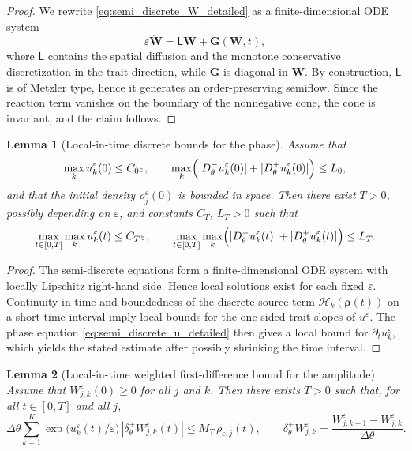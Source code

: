 \documentclass[11pt, dina4, amsfont12]{article}
\newtheorem{lemma}{Lemma}[section]
\begin{document}
\begin{proof}
We rewrite \eqref{eq:semi_discrete_W_detailed} as a finite-dimensional ODE system
\[
\varepsilon \dot{\mathbf W}=\mathsf L\mathbf W+\mathbf G(\mathbf W,t),
\]
where \(\mathsf L\) contains the spatial diffusion and the monotone conservative discretization in the trait direction, while \(\mathbf G\) is diagonal in \(\mathbf W\). By construction, \(\mathsf L\) is of Metzler type, hence it generates an order-preserving semiflow. Since the reaction term vanishes on the boundary of the nonnegative cone, the cone is invariant, and the claim follows.
\end{proof}

\begin{lemma}[Local-in-time discrete bounds for the phase]\label{lem:slope_u}
Assume that
\[
\max_k u_k^\varepsilon(0)\le C_0\varepsilon,
\qquad
\max_k\Bigl(|D_\theta^-u_k^\varepsilon(0)|+|D_\theta^+u_k^\varepsilon(0)|\Bigr)\le L_0,
\]
and that the initial density \(\rho_j^\varepsilon(0)\) is bounded in space. Then there exist \(T>0\), possibly depending on \(\varepsilon\), and constants \(C_T\), \(L_T>0\) such that
\[
\max_{t\in[0,T]}\max_k u_k^\varepsilon(t)\le C_T\varepsilon,
\qquad
\max_{t\in[0,T]}\max_k\Bigl(|D_\theta^-u_k^\varepsilon(t)|+|D_\theta^+u_k^\varepsilon(t)|\Bigr)\le L_T.
\]
\end{lemma}

\begin{proof}
The semi-discrete equations form a finite-dimensional ODE system with locally Lipschitz right-hand side. Hence local solutions exist for each fixed \(\varepsilon\). Continuity in time and boundedness of the discrete source term \(\mathcal H_k(\boldsymbol\rho(t))\) on a short time interval imply local bounds for the one-sided trait slopes of \(u^\varepsilon\). The phase equation \eqref{eq:semi_discrete_u_detailed} then gives a local bound for \(\partial_t u_k^\varepsilon\), which yields the stated estimate after possibly shrinking the time interval.
\end{proof}

\begin{lemma}[Local-in-time weighted first-difference bound for the amplitude]\label{lem:W_diff}
Assume that \(W_{j,k}^\varepsilon(0)\ge0\) for all \(j\) and \(k\). Then there exists \(T>0\) such that, for all \(t\in[0,T]\) and all \(j\),
\begin{equation}\label{eq:weighted_first_diff_W_simple}
\Delta\theta\sum_{k=1}^K
\exp\!\bigl(u_k^\varepsilon(t)/\varepsilon\bigr)\,|\delta_\theta^+ W_{j,k}^\varepsilon(t)|
\le
M_T\,\rho_{\varepsilon,j}(t),
\qquad
\delta_\theta^+W_{j,k}^\varepsilon=
\frac{W_{j,k+1}^\varepsilon-W_{j,k}^\varepsilon}{\Delta\theta}.
\end{equation}
\end{lemma}
\end{document}
